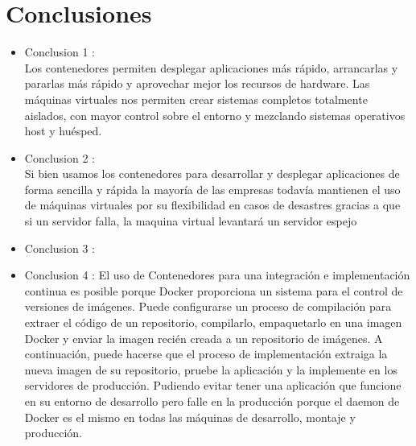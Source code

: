 \documentclass[preprint,12pt]{elsarticle}
\begin{document}



\section{Conclusiones}

\begin{itemize}

\item Conclusion 1 : \\ Los contenedores permiten desplegar aplicaciones más rápido, arrancarlas y pararlas más rápido y aprovechar mejor los recursos de hardware. Las máquinas virtuales nos permiten crear sistemas completos totalmente aislados, con mayor control sobre el entorno y mezclando sistemas operativos host y huésped. 

\item Conclusion 2 : \\ Si bien usamos los contenedores para desarrollar y desplegar aplicaciones de forma sencilla y rápida la mayoría de las empresas todavía mantienen el uso de máquinas virtuales por su flexibilidad en casos de desastres gracias a que si un servidor falla, la maquina virtual levantará un servidor espejo

\item Conclusion 3 : \\ 

\item Conclusion 4 :
El uso de  Contenedores para una integración e implementación continua es posible porque Docker proporciona un sistema para el control de versiones de imágenes. Puede configurarse un proceso de compilación para extraer el código de un repositorio, compilarlo, empaquetarlo en una imagen Docker y enviar la imagen recién creada a un repositorio de imágenes. A continuación, puede hacerse que el proceso de implementación extraiga la nueva imagen de su repositorio, pruebe la aplicación y la implemente en los servidores de producción. Pudiendo evitar tener una aplicación que funcione en su entorno de desarrollo pero falle en la producción porque el daemon de Docker es el mismo en todas las máquinas de desarrollo, montaje y producción.
\end{itemize}


	
	\newpage
	
		 
	
	
\end{document}
